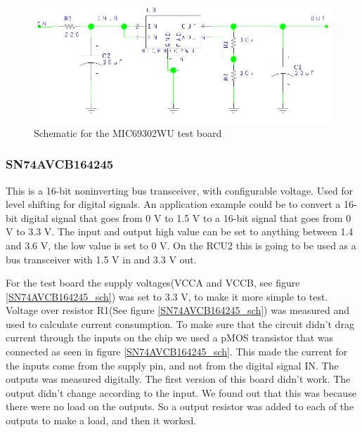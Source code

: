 \documentclass[12pt]{article}
\numberwithin{figure}{section}
\begin{document}
\begin{figure}[!htbp]
  \centering
  \includegraphics[width=\textwidth]{MIC_sch.png}
  \caption{Schematic for the MIC69302WU test board}
  \label{MIC_sch}
\end{figure}
\FloatBarrier

\subsubsection{SN74AVCB164245}
This is a 16-bit noninverting bus transceiver, with configurable voltage. Used for level shifting for digital signals.
An application example could be to convert a 16-bit digital signal that goes from 0 V to 1.5 V to a 16-bit signal that goes from 0 V to 3.3 V.
The input and output high value can be set to anything between 1.4 and 3.6 V, the low value is set to 0 V. On the \ac{RCU2} this is going to be used as a bus transceiver with 1.5 V in and 3.3 V out. 

For the test board the supply voltages(VCCA and VCCB, see figure \ref{SN74AVCB164245_sch}) was set to 3.3 V, to make it more simple to test.
Voltage over resistor R1(See figure \ref{SN74AVCB164245_sch}) was measured and used to calculate current consumption.
To make sure that the circuit didn't drag current through the inputs on the chip we used a pMOS transistor that was connected as seen in figure \ref{SN74AVCB164245_sch}.
This made the current for the inputs come from the supply pin, and not from the digital signal IN. The outputs was measured digitally.
The first version of this board didn't work. The output didn't change according to the input. We found out that this was because there were no load on the outputs.
So a output resistor was added to each of the outputs to make a load, and then it worked. 	
\end{document}
